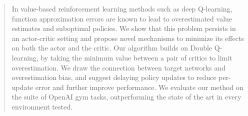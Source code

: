\documentclass{article}
\begin{document}



\printAffiliationsAndNotice{}  %

\begin{abstract}
In value-based reinforcement learning methods such as deep Q-learning, function approximation errors are known to lead  to overestimated value estimates and suboptimal policies. We show that this problem persists in an actor-critic setting and propose novel mechanisms to minimize its effects on both the actor and the critic. Our algorithm builds on Double Q-learning, by taking the minimum value between a pair of critics to limit overestimation. We draw the connection between target networks and overestimation bias, and suggest delaying policy updates to reduce per-update error and further improve performance. We evaluate our method on the suite of OpenAI gym tasks, outperforming the state of the art in every environment tested.
\end{abstract}
\end{document}
